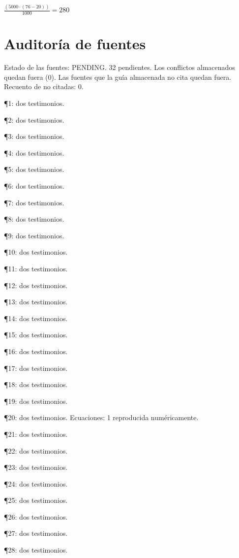 \documentclass{book}
\begin{document}
\(\frac{\left(5000\cdot \left(76-20\right)\right)}{1000} = 280\)
\chapter{Auditoría de fuentes}

\noindent Estado de las fuentes: PENDING. 32 pendientes. Los conflictos almacenados quedan fuera (0). Las fuentes que la guía almacenada no cita quedan fuera. Recuento de no citadas: 0.

\noindent ¶1: dos testimonios.

\noindent ¶2: dos testimonios.

\noindent ¶3: dos testimonios.

\noindent ¶4: dos testimonios.

\noindent ¶5: dos testimonios.

\noindent ¶6: dos testimonios.

\noindent ¶7: dos testimonios.

\noindent ¶8: dos testimonios.

\noindent ¶9: dos testimonios.

\noindent ¶10: dos testimonios.

\noindent ¶11: dos testimonios.

\noindent ¶12: dos testimonios.

\noindent ¶13: dos testimonios.

\noindent ¶14: dos testimonios.

\noindent ¶15: dos testimonios.

\noindent ¶16: dos testimonios.

\noindent ¶17: dos testimonios.

\noindent ¶18: dos testimonios.

\noindent ¶19: dos testimonios.

\noindent ¶20: dos testimonios. Ecuaciones: 1 reproducida numéricamente.

\noindent ¶21: dos testimonios.

\noindent ¶22: dos testimonios.

\noindent ¶23: dos testimonios.

\noindent ¶24: dos testimonios.

\noindent ¶25: dos testimonios.

\noindent ¶26: dos testimonios.

\noindent ¶27: dos testimonios.

\noindent ¶28: dos testimonios.
\end{document}
